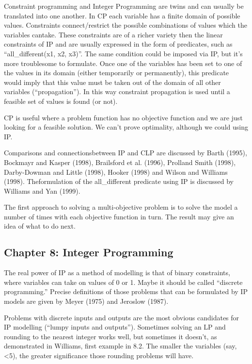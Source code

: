 \documentclass[13pt, letterpaper, twoside]{book}
\begin{document}
Constraint programming and Integer Programming are twins and can usually be translated into one another. In CP each variable has a finite domain of possible values. Constraints connect/restrict the possible combinations of values which the variables cantake. These constraints are of a richer variety then the linear constraints of IP and are usually expressed in the form of predicates, such as ``all\_different(x1, x2, x3)''. The same condition could be imposed via IP, but it's more troublesome to formulate. Once one of the variables has been set to one of the values in its domain (either temporarily or permanently), this predicate would imply that this value must be taken out of the domain of all other variables (``propagation''). In this way constraint propagation is used until a feasible set of values is found (or not).

CP is useful where a problem function has no objective function and we are just looking for a feasible solution. We can't prove optimality, although we could using IP.

Comparisons and connectionsbetween IP and CLP are discussed by Barth (1995), Bockmayr and Kasper (1998), Brailsford
et al.
(1996), Prolland Smith (1998), Darby-Dowman and Little (1998), Hooker (1998) and Wilson and Williams (1998). Theformulation of the all\_different predicate using IP is discussed by Williams and Yan (1999).

The first approach to solving a multi-objective problem is to solve the model a number of times with each objective function in turn. The result may give an idea of what to do next.


\subsection{Chapter 8: Integer Programming}

The real power of IP as a method of modelling is that of binary constraints, where variables can take on values of 0 or 1. Maybe it should be called ``discrete programming.'' Precise definitions of those problems that can be formulated by IP models are given by Meyer (1975) and Jeroslow (1987). 

Problems with discrete inputs and outputs are the most obvious candidates for IP modelling (``lumpy inputs and outputs''). Sometimes solving an LP and rounding to the nearest integer works well, but sometimes it doesn't, as demonstrated in Williams, first example in 8.2. The smaller the variables (say, <5), the greater significance those rounding problems will have. 
\end{document}
